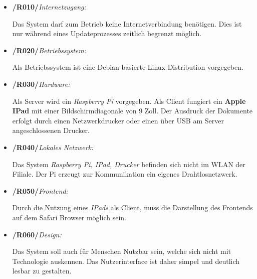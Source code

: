 \vspace{1cm}
\begin{itemize}
    \item \textbf{/R010/}\textit{Internetzugang:} \par
    Das System darf zum Betrieb keine Internetverbindung benötigen. Dies ist nur während eines Updateprozesses zeitlich begrenzt möglich.
    
    \item \textbf{/R020/}\textit{Betriebssystem:} \par
    Als Betriebssystem ist eine Debian basierte Linux-Distribution vorgegeben.
   
    \item \textbf{/R030/}\textit{Hardware:} \par
    Als Server wird ein \textit{Raspberry Pi} vorgegeben. Als Client fungiert ein \textbf{Apple IPad} mit einer Bildschirmdiagonale von 9 Zoll. Der Ausdruck der Dokumente erfolgt durch einen Netzwerkdrucker oder einen über USB am Server angeschlossenen Drucker.
  
    \item \textbf{/R040/}\textit{Lokales Netzwerk:} \par
    Das System \textit{Raspberry Pi, IPad, Drucker} befinden sich nicht im WLAN der Filiale. Der Pi erzeugt zur Kommunikation ein eigenes Drahtlosnetzwerk.
  
    \item \textbf{/R050/}\textit{Frontend:} \par
    Durch die Nutzung eines \textit{IPads} als Client, muss die Darstellung des Frontends auf dem Safari Browser möglich sein.
  
    \item \textbf{/R060/}\textit{Design:} \par
    Das System soll auch für Menschen Nutzbar sein, welche sich nicht mit Technologie auskennen. Das Nutzerinterface ist daher simpel und deutlich lesbar zu gestalten.
\end{itemize}
